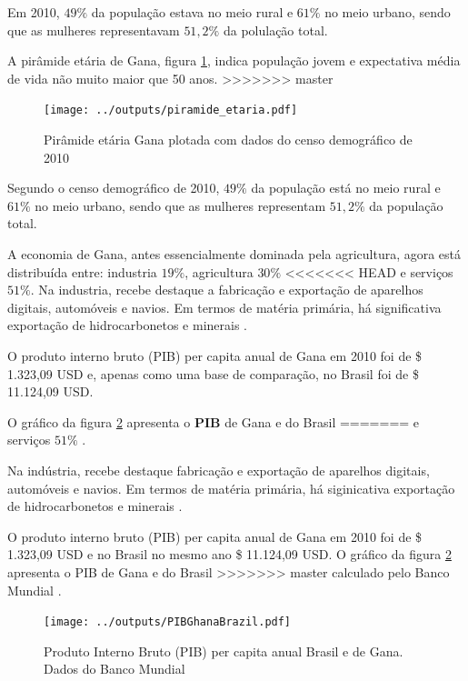 Em 2010, $49\%$ da população estava no meio rural e $61\%$ no meio urbano, sendo
que as mulheres representavam $51,2\%$ da polulação total.

A pirâmide etária de Gana, figura \ref{fig:piramedegana}, indica população 
jovem e expectativa média de vida não muito maior que 50 anos. 
>>>>>>> master

\begin{figure}[H]
  \centering
  \texttt{[image: ../outputs/piramide\_etaria.pdf]}
  \caption{Pirâmide etária Gana plotada com dados do censo 
           demográfico de 2010 \citep{ghanacensus2013} \label{fig:piramedegana}}
\end{figure}

Segundo o censo demográfico de 2010, $49\%$ da população está no meio rural e 
$61\%$ no meio urbano, sendo que as mulheres representam $51,2\%$ da população
total.

A economia de Gana, antes essencialmente dominada pela agricultura, 
agora está distribuída entre: industria $19\%$, agricultura $30\%$ 
<<<<<<< HEAD
e serviços $51\%$. Na industria, recebe destaque a fabricação e 
exportação de aparelhos digitais, automóveis e navios. 
Em termos de matéria primária, há significativa exportação de 
hidrocarbonetos e minerais \citep{ghanacensus2013}.
 
 
 

O produto interno bruto (PIB) per capita anual de Gana em 2010 foi
de \$ 1.323,09 USD e, apenas como uma base de comparação, no Brasil 
foi de \$ 11.124,09 USD.


O gráfico da figura \ref{fg:pib} apresenta o \textbf{PIB} de Gana e do Brasil 
=======
e serviços $51\%$ \citep{ghanacensus2013}.

Na indústria, recebe destaque fabricação e exportação de aparelhos digitais, 
automóveis e navios. Em termos de matéria primária, há siginicativa 
exportação de hidrocarbonetos e minerais \citep{ghanacensus2013}.

O produto interno bruto (PIB) per capita anual de Gana em 2010 foi
de \$ 1.323,09 USD e no Brasil no mesmo ano \$ 11.124,09 USD.
O gráfico da figura \ref{fg:pib} apresenta o PIB de Gana e do Brasil 
>>>>>>> master
calculado pelo Banco Mundial \citep{bancomundial}.

\begin{figure}[H]
\begin{center}
  \texttt{[image: ../outputs/PIBGhanaBrazil.pdf]}
  \caption{Produto Interno Bruto (PIB) per capita anual Brasil e de Gana. 
           Dados do Banco Mundial \citep{bancomundial} \label{fg:pib}}
\end{center}
\end{figure}

